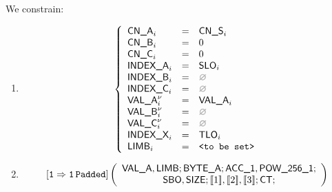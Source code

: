 \begin{center}
\end{center}

We constrain:
\begin{enumerate}
	\item 
\[
	\left\{
	\begin{array}{lclr}
		\cnA      _{i}       & = & \cnS_{i}      \\
		\cnB      _{i}       & = & 0             \\
		\cnC      _{i}       & = & 0             \\
		\indexA   _{i}       & = & \slo_{i}      \\
		\indexB   _{i}       & = & \nothing      \\
		\indexC   _{i}       & = & \nothing      \\
		\valA     _{i}\new{} & = & \valA_{i}     \\
		\valB     _{i}\new{} & = & \nothing      \\
		\valC     _{i}\new{} & = & \nothing      \\
		\indexX   _{i}       & = & \tlo_{i}      \\
		\limb     _{i}       & = & \valueToBeSet \\
	\end{array}
	\right.
\]
	\item 
\[
	\operatorname{\mathtt{[1\Rightarrow1\,Padded]}}
	\left(
	\begin{array}{c}
	\textsf{VAL\_A}{}, \textsf{LIMB}{}; \textsf{BYTE\_A}{}; \textsf{ACC}\textsf{\_1}, \textsf{POW\_256\_1}; \\
	\textsf{SBO}{}, \textsf{SIZE}{}; [\![1]\!], [\![2]\!], [\![3]\!]; \textsf{CT}{}; \\
	\end{array}
	\right)
\]
\end{enumerate}
